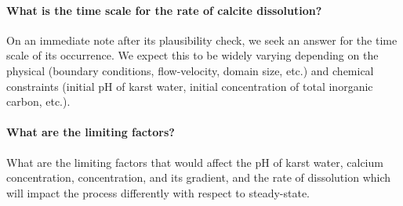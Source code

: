 \paragraph*{What is the time scale for the rate of calcite dissolution?} On an immediate note after its plausibility check, 
we seek an answer for the time scale of its occurrence. We expect this to be widely varying depending on the physical (boundary conditions, flow-velocity, 
domain size, etc.) and chemical constraints (initial pH of karst water, initial concentration of total inorganic carbon, etc.).

\paragraph*{What are the limiting factors?} What are the limiting factors that would affect the pH of karst water, 
calcium concentration,  concentration, and its gradient, and the rate of dissolution which will impact the process differently 
with respect to steady-state. 
\endinput